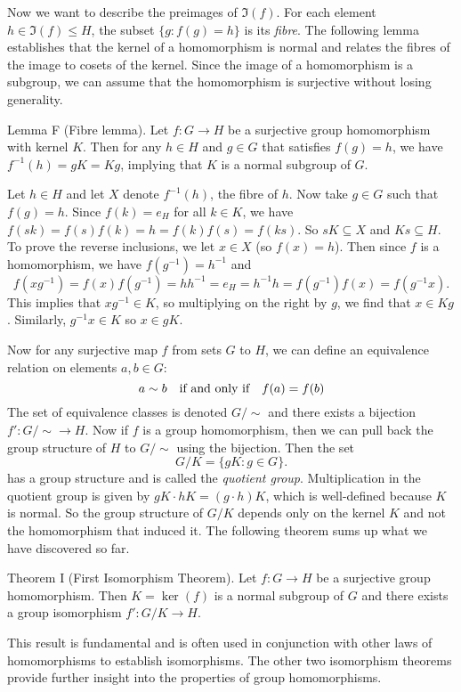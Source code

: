 Now we want to describe the preimages of $\Im(f)$. For each element $h\in \Im(f)\leq H$, the subset $\{g : f(g) = h\}$ is its {\it fibre}. The following lemma establishes that the kernel of a homomorphism is normal and relates the fibres of the image to cosets of the kernel. Since the image of a homomorphism is a subgroup, we can assume that the homomorphism is surjective without losing generality.

\parenproclaim Lemma F (Fibre lemma). Let $f:G\rightarrow H$ be a surjective group homomorphism with kernel $K$. Then for any $h\in H$ and $g\in G$ that satisfies $f(g) = h$, we have $f^{-1}(h) = gK = Kg$, implying that $K$ is a normal subgroup of $G$.

\proof Let $h\in H$ and let $X$ denote $f^{-1}(h)$, the fibre of $h$. Now take $g\in G$ such that $f(g) = h$. Since $f(k) = e_H$ for all $k\in K$, we have $f(sk) = f(s)f(k) = h = f(k)f(s) = f(ks)$. So $sK\subseteq X$ and $Ks\subseteq H$. To prove the reverse inclusions, we let $x\in X$ (so $f(x) = h$). Then since $f$ is a homomorphism, we have $f(g^{-1}) = h^{-1}$ and
$$f(xg^{-1}) = f(x)f(g^{-1}) = hh^{-1} = e_H = h^{-1}h = f(g^{-1})f(x) = f(g^{-1}x).$$
This implies that $xg^{-1}\in K$, so multiplying on the right by $g$, we find that $x\in Kg$. Similarly, $g^{-1}x\in K$ so $x\in gK$.\slug

Now for any surjective map $f$ from sets $G$ to $H$, we can define an equivalence relation on elements $a,b\in G$:
$$a\sim b\quad \hbox{if and only if}\quad f(a) = f(b)$$
The set of equivalence classes is denoted $G/{\sim}$ and there exists a bijection $f':G/{\sim} \rightarrow H$. Now if $f$ is a group homomorphism, then we can pull back the group structure of $H$ to $G/{\sim}$ using the bijection. Then the set
$$G/K = \{gK : g\in G\}.$$
has a group structure and is called the {\it quotient group}. Multiplication in the quotient group is given by $gK\cdot hK = (g\cdot h) K$, which is well-defined because $K$ is normal. So the group structure of $G/K$ depends only on the kernel $K$ and not the homomorphism that induced it. The following theorem sums up what we have discovered so far.

\parenproclaim Theorem I (First Isomorphism Theorem). Let $f:G\rightarrow H$ be a surjective group homomorphism. Then $K = \ker(f)$ is a normal subgroup of $G$ and there exists a group isomorphism $f':G/K \rightarrow H$.\slug

This result is fundamental and is often used in conjunction with other laws of homomorphisms to establish isomorphisms. The other two isomorphism theorems provide further insight into the properties of group homomorphisms.

